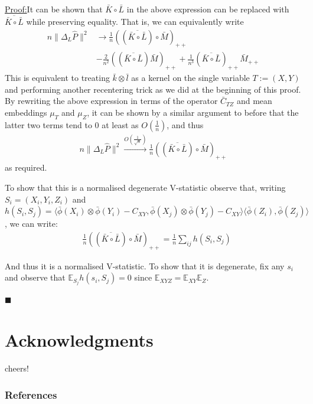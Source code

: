 \documentclass[]{article}
\newenvironment{claimproof}[1]{\par\noindent\underline{Proof:}\space#1}{\hfill $\blacksquare$}
\begin{document}
\begin{claimproof}
It can be shown that $\bar{K}\circ \bar{L}$ in the above expression can be replaced with $\overline{\bar{K}\circ \bar{L}}$ while preserving equality. That is, we can equivalently write
\begin{align*}
n\|\Delta_L \hat{P}\|^2 & \longrightarrow \frac{1}{n}((\overline{\bar{K}\circ \bar{L}}) \circ \bar{M})_{++}\\& - \frac{2}{n^2}((\overline{\bar{K}\circ \bar{L}})\bar{M})_{++} + \frac{1}{n^3}(\overline{\bar{K}\circ \bar{L}})_{++}\bar{M}_{++}
\end{align*}
This is equivalent to treating $\bar{k}\otimes\bar{l}$ as a kernel on the single variable $T:=(X,Y)$ and performing another recentering trick as we did at the beginning of this proof. By rewriting the above expression in terms of the operator $\bar{C}_{TZ}$ and mean embeddings $\mu_T$ and $\mu_Z$, it can be shown by a similar argument to before that the latter two terms tend to 0 at least as $O(\frac{1}{n})$, and thus  
\begin{align*}
n\|\Delta_L \hat{P}\|^2 \xrightarrow{O(\frac{1}{\sqrt{n}})} \frac{1}{n}((\overline{\bar{K}\circ \bar{L}}) \circ \bar{M})_{++}
\end{align*} as required.

To show that this is a normalised degenerate V-statistic observe that, writing $S_i=(X_i,Y_i,Z_i)$ and $h(S_i,S_j) = \langle\bar{\phi}(X_i)\otimes\bar{\phi}(Y_i) - C_{XY},\bar{\phi}(X_j)\otimes\bar{\phi}(Y_j) - C_{XY}\rangle\langle\bar{\phi}(Z_i),\bar{\phi}(Z_j)\rangle$, we can write:
\begin{align*}
&\frac{1}{n}((\overline{\bar{K}\circ \bar{L}}) \circ \bar{M})_{++}= \frac{1}{n}\sum_{ij} h(S_i,S_j)
\end{align*}

And thus it is a normalised V-statistic. To show that it is degenerate, fix any $s_i$ and observe that $\mathbb{E}_{S_j}h(s_i,S_j)=0$ since $\mathbb{E}_{XYZ} =\mathbb{E}_{XY}\mathbb{E}_{Z}$.

\end{claimproof}



\section*{Acknowledgments} 
cheers!

\subsubsection*{References}

\end{document}
